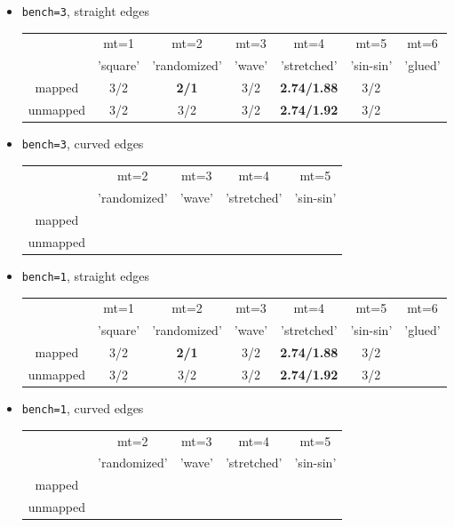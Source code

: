 \begin{itemize}

\item {\tt bench=3}, straight edges

\begin{tabular}{c|cccccc}
\hline
& mt=1     &  mt=2        &  mt=3  &  mt=4       & mt=5  & mt=6\\
& 'square' & 'randomized' & 'wave' & 'stretched' & 'sin-sin' & 'glued'\\
\hline
mapped   & 3/2 & {\bf 2/1} &3/2 & {\bf 2.74/1.88} &3/2 \\
unmapped & 3/2 &3/2 &3/2 & {\bf 2.74/1.92} &3/2 \\
\hline
\end{tabular}


\item {\tt bench=3}, curved edges

\begin{tabular}{c|cccc}
\hline
 &  mt=2        &  mt=3  &  mt=4       & mt=5 \\
 & 'randomized' & 'wave' & 'stretched' & 'sin-sin' \\
\hline
mapped   & \\ 
unmapped &  \\
\hline
\end{tabular}


\item {\tt bench=1}, straight edges

\begin{tabular}{c|cccccc}
\hline
& mt=1     &  mt=2        &  mt=3  &  mt=4       & mt=5  & mt=6\\
& 'square' & 'randomized' & 'wave' & 'stretched' & 'sin-sin' & 'glued'\\
\hline
mapped   & 3/2 & {\bf 2/1} &3/2 & {\bf 2.74/1.88} &3/2 \\
unmapped & 3/2 &3/2 &3/2 & {\bf 2.74/1.92} &3/2 \\
\hline
\end{tabular}


\item {\tt bench=1}, curved edges

\begin{tabular}{c|cccc}
\hline
&  mt=2        &  mt=3  &  mt=4       & mt=5 \\
& 'randomized' & 'wave' & 'stretched' & 'sin-sin' \\
\hline
mapped   & \\ 
unmapped &  \\
\hline
\end{tabular}




\end{itemize}

